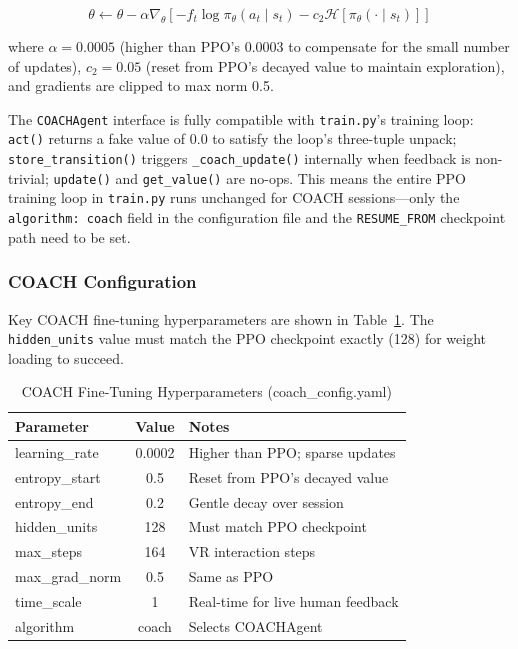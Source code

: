 \documentclass[../report.tex]{subfiles}
\begin{document}
    \begin{equation}
        \theta \leftarrow \theta - \alpha \nabla_\theta \left[ -f_t \log \pi_\theta(a_t \mid s_t) - c_2 \mathcal{H}[\pi_\theta(\cdot \mid s_t)] \right]
        \label{eq:coach_update}
    \end{equation}

    where $\alpha = 0.0005$ (higher than PPO's 0.0003 to compensate for the small number of updates), $c_2 = 0.05$ (reset from PPO's decayed value to maintain exploration), and gradients are clipped to max norm 0.5.

    The \texttt{COACHAgent} interface is fully compatible with \texttt{train.py}'s training loop: \texttt{act()} returns a fake value of 0.0 to satisfy the loop's three-tuple unpack; \texttt{store\_transition()} triggers \texttt{\_coach\_update()} internally when feedback is non-trivial; \texttt{update()} and \texttt{get\_value()} are no-ops. This means the entire PPO training loop in \texttt{train.py} runs unchanged for COACH sessions—only the \texttt{algorithm: coach} field in the configuration file and the \texttt{RESUME\_FROM} checkpoint path need to be set.

    \subsubsection{COACH Configuration}

    Key COACH fine-tuning hyperparameters are shown in Table~\ref{tab:coach-config}. The \texttt{hidden\_units} value must match the PPO checkpoint exactly (128) for weight loading to succeed.

    \begin{table}[H]
        \centering
        \caption{COACH Fine-Tuning Hyperparameters (coach\_config.yaml)}
        \label{tab:coach-config}
        \begin{tabular}{lcl}
            \toprule
            \textbf{Parameter} & \textbf{Value} & \textbf{Notes} \\
            \midrule
            learning\_rate & 0.0002 & Higher than PPO; sparse updates \\
            entropy\_start & 0.5 & Reset from PPO's decayed value \\
            entropy\_end & 0.2 & Gentle decay over session \\
            hidden\_units & 128 & Must match PPO checkpoint \\
            max\_steps & 164 & VR interaction steps \\
            max\_grad\_norm & 0.5 & Same as PPO \\
            time\_scale & 1 & Real-time for live human feedback \\
            algorithm & coach & Selects COACHAgent \\
            \bottomrule
        \end{tabular}
    \end{table}
\end{document}
